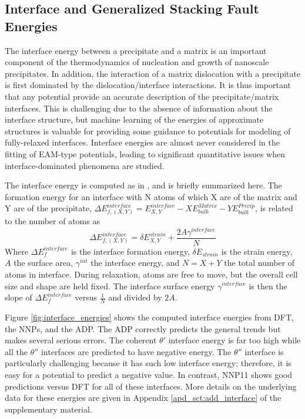 \documentclass{article}
\begin{document}
\subsection{Interface and Generalized Stacking Fault Energies} \label{sct:interfaces}

The interface energy between a precipitate and a matrix is an important component of the thermodynamics of nucleation and growth of nanoscale precipitates.  In addition, the interaction of a matrix dislocation with a precipitate is first dominated by the dislocation/interface interactions.  It is thus important that any potential provide an accurate description of the precipitate/matrix interfaces.  This is challenging due to the absence of information about the interface structure, but machine learning of the energies of approximate structures is valuable for providing some guidance to potentials for modeling of fully-relaxed interfaces.  Interface energies are almost never considered in the fitting of EAM-type potentials, leading to significant quantitative issues when interface-dominated phenomena are studied. 

The interface energy is computed as in \cite{Vaithyanathan2004MultiscaleAlloys}, and is briefly summarized here.
The formation energy for an interface with N atoms of which X are of the matrix and Y are of the precipitate,
$\Delta E^{interface}_{f, (X,Y)} = E^{interface}_{X,Y}-XE^{Matrix}_{bulk}-YE^{Precip}_{bulk}$,
is related to the number of atoms as
\begin{equation}
\Delta E^{interface}_{f,(X,Y)} = \delta E^{strain}_{X,Y} + \frac{2A\gamma^{interface}}{N}
\end{equation}
Where $\Delta E^{interface}_f$ is the interface formation energy, $\delta E_{strain}$ is the strain energy, $A$ the surface area,
$\gamma^{int}$ the interface energy, and $N=X+Y$ the total number of atoms in interface.
During relaxation, atoms are free to move, but the overall cell size and shape are held fixed.
The interface surface energy $\gamma^{interface}$ is then the slope of $\Delta E^{interface}_f$ versus $\frac{1}{N}$ and divided by $2A$.

Figure \ref{fig:interface_energies} shows the computed interface energies from DFT, the NNPs, and the ADP.
The ADP correctly predicts the general trends but makes several serious errors.
The coherent $\theta'$ interface energy is far too high while all the $\theta''$ interfaces are predicted to have negative energy.
The $\theta''$ interface is particularly challenging because it has such low interface energy; therefore, it is easy for a potential to predict a negative value.
In contrast, NNP11 shows good predictions versus DFT for all of these interfaces.  More details on the underlying data for these energies are given in Appendix \ref{apd_sct:add_interface} of the supplementary material.
\end{document}
